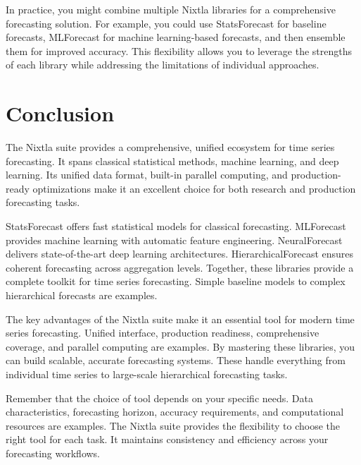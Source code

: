 In practice, you might combine multiple Nixtla libraries for a comprehensive forecasting solution. For example, you could use StatsForecast for baseline forecasts, MLForecast for machine learning-based forecasts, and then ensemble them for improved accuracy. This flexibility allows you to leverage the strengths of each library while addressing the limitations of individual approaches.



\section{Conclusion}

The Nixtla suite provides a comprehensive, unified ecosystem for time series forecasting. It spans classical statistical methods, machine learning, and deep learning. Its unified data format, built-in parallel computing, and production-ready optimizations make it an excellent choice for both research and production forecasting tasks.

StatsForecast offers fast statistical models for classical forecasting. MLForecast provides machine learning with automatic feature engineering. NeuralForecast delivers state-of-the-art deep learning architectures. HierarchicalForecast ensures coherent forecasting across aggregation levels. Together, these libraries provide a complete toolkit for time series forecasting. Simple baseline models to complex hierarchical forecasts are examples.

The key advantages of the Nixtla suite make it an essential tool for modern time series forecasting. Unified interface, production readiness, comprehensive coverage, and parallel computing are examples. By mastering these libraries, you can build scalable, accurate forecasting systems. These handle everything from individual time series to large-scale hierarchical forecasting tasks.

Remember that the choice of tool depends on your specific needs. Data characteristics, forecasting horizon, accuracy requirements, and computational resources are examples. The Nixtla suite provides the flexibility to choose the right tool for each task. It maintains consistency and efficiency across your forecasting workflows.

